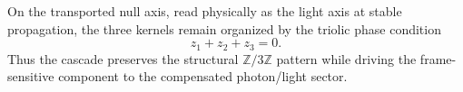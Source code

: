 \begin{remark}
On the transported null axis, read physically as the light axis at stable propagation, the three kernels remain organized by the
triolic phase condition
\[
z_1+z_2+z_3=0.
\]
Thus the cascade preserves the structural $\mathbb{Z}/3\mathbb{Z}$
pattern while driving the frame-sensitive component to the compensated
photon/light sector.
\end{remark}


